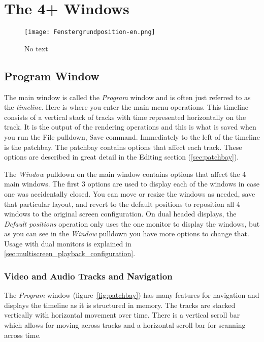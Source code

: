 \chapter{The 4+ Windows}%
\label{cha:the_4_windows}

\begin{figure}[htpb]
    \centering
    \texttt{[image: Fenstergrundposition-en.png]}
    \captionsetup{labelformat=empty, textformat=empty}
    \caption[The four windows (cc-by-sa Olaf)]{No text}    
    \label{fig:Fenstergrundposition-en}
\end{figure}

\section{Program Window}%
\label{sec:program_window}

The main window is called the \textit{Program} window and is often just referred to as the \textit{timeline}.  Here is where you enter the main menu operations.  
This timeline consists of a vertical stack of tracks with time represented horizontally on the track. 
It is the output of the rendering operations and this is what is saved when you run the File pulldown, Save command.
Immediately to the left of the timeline is the patchbay. The patchbay contains options that affect each track.  
These options are described in great detail in the Editing section (\ref{sec:patchbay}).

The \textit{Window} pulldown on the main window contains options that affect the 4 main windows. The first 3 options are used to display each of the windows in case one was accidentally closed.  You can
move or resize the windows as needed, save that particular layout, and revert to the default positions
to reposition all 4 windows to the original screen configuration.
On dual headed displays, the \textit{Default positions} operation only uses the one monitor to display the windows, but as you
can see in the \textit{Window} pulldown you have more options to change that. Usage with dual monitors is
explained in \ref{sec:multiscreen_playback_configuration}.

\subsection{Video and Audio Tracks and Navigation}%
\label{sub:video_and_audio_tracks_and_navigation}

The \textit{Program} window (figure~\ref{fig:patchbay}) has many features for navigation and displays the timeline as it is structured in memory. The tracks are stacked vertically with horizontal movement over time.
There is a vertical scroll bar which allows for moving across tracks and a horizontal scroll bar for scanning across time. 

